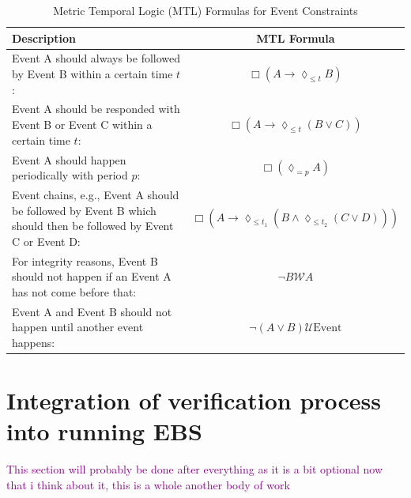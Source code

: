 \documentclass[twocolumn]{article}
\newcommand{\note}[1] {
	\textcolor{Purple}{#1}

}
\begin{document}
\begin{table}[t]
	\centering
	\renewcommand{\arraystretch}{1.5}
	\begin{tabular}{|p{5cm}|c|}
		\hline
		\textbf{Description}                                                                                           & \textbf{MTL Formula} \\
		\hline
		Event A should always be followed by Event B within a certain time \( t \):                                    &
		$\Box (A \rightarrow \lozenge_{\leq t} B)$                                                                                            \\
		\hline
		Event A should be responded with Event B or Event C within a certain time \( t \):                             &
		$\Box (A \rightarrow \lozenge_{\leq t} (B \lor C))$                                                                                   \\
		\hline
		Event A should happen periodically with period \( p \):                                                        &
		$\Box (\lozenge_{= p} A)$                                                                                                             \\
		\hline
		Event chains, e.g., Event A should be followed by Event B which should then be followed by Event C or Event D: &
		$\Box (A \rightarrow \lozenge_{\leq t_1} (B \land \lozenge_{\leq t_2} (C \lor D)))$                                                   \\
		\hline
		For integrity reasons, Event B should not happen if an Event A has not come before that:                       &
		$\neg B \mathcal{W} A$                                                                                                                \\
		\hline
		Event A and Event B should not happen until another event happens:                                             &
		$\neg (A \lor B) \mathcal{U} \text{Event}$                                                                                            \\
		\hline
	\end{tabular}
	\caption{Metric Temporal Logic (MTL) Formulas for Event Constraints}
	\label{table:mtl_formulas}
\end{table}


\section{Integration of verification process into running EBS}
\note{This section will probably be done after everything as it is a bit optional now that i think about it, this is a whole another body of work}
\end{document}
